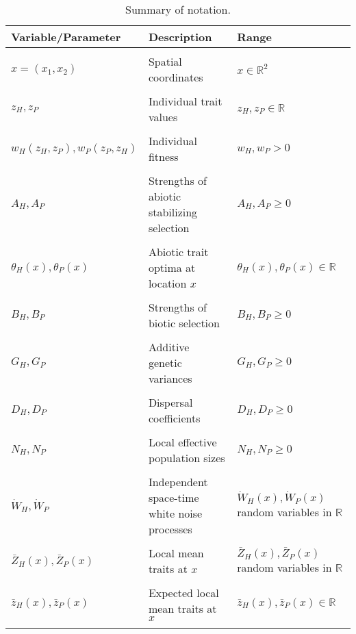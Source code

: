\documentclass{article}
\begin{document}
\begin{table}[htbp]
\caption{Summary of notation.}
\label{Table:Parameters}
\centering
\begin{tabular}{lll}\hline
Variable/Parameter          & Description                                  & Range                                                     \\ \hline \\
$x=(x_1,x_2)$               & Spatial coordinates                          & $x\in\mathbb R^2$                                         \\ \\
$z_H,z_P$                   & Individual trait values                      & $z_H,z_P\in\mathbb R$                                     \\ \\
$w_H(z_H,z_P),w_P(z_P,z_H)$ & Individual fitness                           & $w_H,w_P>0$                                               \\ \\
$A_H,A_P$                   & Strengths of abiotic stabilizing selection   & $A_H,A_P\geq0$                                            \\ \\
$\theta_H(x),\theta_P(x)$   & Abiotic trait optima at location $x$         & $\theta_H(x),\theta_P(x)\in\mathbb R$                     \\ \\
$B_H,B_P$                   & Strengths of biotic selection                & $B_H,B_P\geq0$                                            \\ \\
$G_H,G_P$                   & Additive genetic variances                   & $G_H,G_P\geq0$                                            \\ \\
$D_H,D_P$                   & Dispersal coefficients                       & $D_H,D_P\geq0$                                            \\ \\
$N_H,N_P$                   & Local effective population sizes             & $N_H,N_P\geq0$                                            \\ \\
$\dot W_H,\dot W_P$         & Independent space-time white noise processes & $\dot W_H(x),\dot W_P(x)$ random variables in $\mathbb R$ \\ \\
$\bar Z_H(x),\bar Z_P(x)$   & Local mean traits at $x$                     & $\bar Z_H(x),\bar Z_P(x)$ random variables in $\mathbb R$ \\ \\
$\bar z_H(x),\bar z_P(x)$   & Expected local mean traits at $x$            & $\bar z_H(x),\bar z_P(x)\in\mathbb R$                     \\ \\ \hline
\end{tabular}
\bigskip{}
\end{table}
\end{document}

